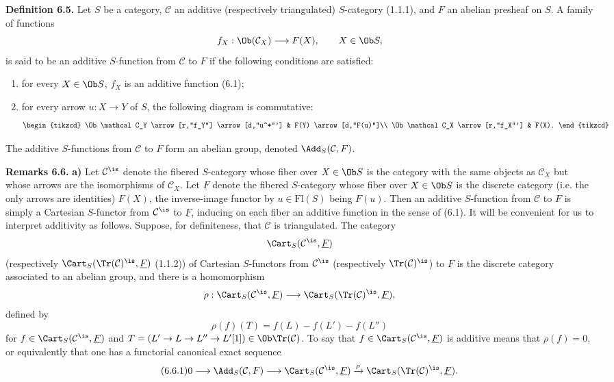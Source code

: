 \documentclass[11pt]{article}
\begin{document}
\textbf{Definition 6.5.} Let \(S\) be a category, \(\mathcal C\) an additive (respectively triangulated) \(S\)-category (1.1.1), and \(F\) an abelian presheaf on \(S\). A family of functions
\[
  f_X:\Ob(\mathcal C_X)\longrightarrow F(X),
  \qquad X\in\Ob S,
\]
is said to be an additive \(S\)-function from \(\mathcal C\) to \(F\) if the following conditions are satisfied:
\begin{enumerate}[label=(\roman*)]
\item for every \(X\in\Ob S\), \(f_X\) is an additive function (6.1);
\item for every arrow \(u:X\to Y\) of \(S\), the following diagram is commutative:
\[
\begin{tikzcd}
\Ob\mathcal C_Y \arrow[r,"f_Y"] \arrow[d,"u^*"'] & F(Y) \arrow[d,"F(u)"]\\
\Ob\mathcal C_X \arrow[r,"f_X"'] & F(X).
\end{tikzcd}
\]
\end{enumerate}
The additive \(S\)-functions from \(\mathcal C\) to \(F\) form an abelian group, denoted \(\Add_S(\mathcal C,F)\).

\textbf{Remarks 6.6.} \textbf{a)} Let \(\mathcal C^{\is}\) denote the fibered \(S\)-category whose fiber over \(X\in\Ob S\) is the category with the same objects as \(\mathcal C_X\) but whose arrows are the isomorphisms of \(\mathcal C_X\). Let \(\underline F\) denote the fibered \(S\)-category whose fiber over \(X\in\Ob S\) is the discrete category (i.e. the only arrows are identities) \(F(X)\), the inverse-image functor by \(u\in\mathrm{Fl}(S)\) being \(F(u)\). Then an additive \(S\)-function from \(\mathcal C\) to \(F\) is simply a Cartesian \(S\)-functor from \(\mathcal C^{\is}\) to \(\underline F\), inducing on each fiber an additive function in the sense of (6.1). It will be convenient for us to interpret additivity as follows. Suppose, for definiteness, that \(\mathcal C\) is triangulated. The category
\[
  \Cart_S(\mathcal C^{\is},\underline F)
\]
(respectively \(\Cart_S(\Tr(\mathcal C)^{\is},\underline F)\) (1.1.2)) of Cartesian \(S\)-functors from \(\mathcal C^{\is}\) (respectively \(\Tr(\mathcal C)^{\is}\)) to \(\underline F\) is the discrete category associated to an abelian group, and there is a homomorphism
\[
  \rho:\Cart_S(\mathcal C^{\is},\underline F)
  \longrightarrow
  \Cart_S(\Tr(\mathcal C)^{\is},\underline F),
\]
defined by
\[
  \rho(f)(T)=f(L)-f(L')-f(L'')
\]
for \(f\in\Cart_S(\mathcal C^{\is},\underline F)\) and \(T=(L'\to L\to L''\to L'[1])\in\Ob\Tr(\mathcal C)\). To say that \(f\in\Cart_S(\mathcal C^{\is},\underline F)\) is additive means that \(\rho(f)=0\), or equivalently that one has a functorial canonical exact sequence
\begin{equation}\tag{6.6.1}
  0\longrightarrow \Add_S(\mathcal C,F)
  \longrightarrow \Cart_S(\mathcal C^{\is},\underline F)
  \xrightarrow{\rho}
  \Cart_S(\Tr(\mathcal C)^{\is},\underline F).
\end{equation}
\end{document}

